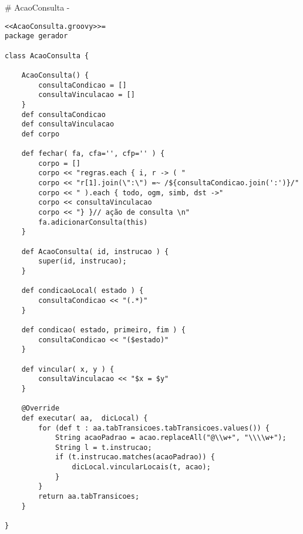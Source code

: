 # AcaoConsulta {-}

\begin{lstlisting}
<<AcaoConsulta.groovy>>=
package gerador

class AcaoConsulta {

    AcaoConsulta() {
        consultaCondicao = []
        consultaVinculacao = []
    }
    def consultaCondicao
    def consultaVinculacao
    def corpo

    def fechar( fa, cfa='', cfp='' ) {
        corpo = []
        corpo << "regras.each { i, r -> ( "
        corpo << "r[1].join(\":\") =~ /${consultaCondicao.join(':')}/"
        corpo << " ).each { todo, ogm, simb, dst ->"
        corpo << consultaVinculacao
        corpo << "} }// ação de consulta \n"
        fa.adicionarConsulta(this)
    }

    def AcaoConsulta( id, instrucao ) {
        super(id, instrucao);
    }

    def condicaoLocal( estado ) {
        consultaCondicao << "(.*)"
    }

    def condicao( estado, primeiro, fim ) {
        consultaCondicao << "($estado)"
    }

    def vincular( x, y ) {
        consultaVinculacao << "$x = $y"
    }

    @Override
    def executar( aa,  dicLocal) {
        for (def t : aa.tabTransicoes.tabTransicoes.values()) {
            String acaoPadrao = acao.replaceAll("@\\w+", "\\\\w+");
            String l = t.instrucao;
            if (t.instrucao.matches(acaoPadrao)) {
                dicLocal.vincularLocais(t, acao);
            }
        }
        return aa.tabTransicoes;
    }

}

\end{lstlisting}
